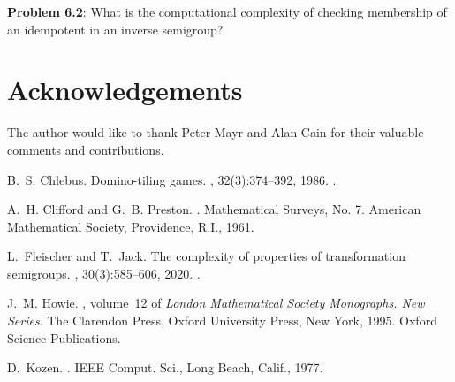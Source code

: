 \documentclass{amsart}
\theoremstyle{remark}
\numberwithin{equation}{section}
\begin{document}
\medskip
{\bf Problem 6.2}: What is the computational complexity of checking membership of an idempotent in an inverse semigroup?

\section{Acknowledgements}
The author would like to thank Peter Mayr and Alan Cain for their valuable comments and contributions.

\begin{thebibliography}{1}

B.~S. Chlebus.
\newblock Domino-tiling games.
, 32(3):374--392, 1986.
\newblock \href {http://dx.doi.org/10.1016/0022-0000(86)90036-X}
  {}.

A.~H. Clifford and G.~B. Preston.
.
\newblock Mathematical Surveys, No. 7. American Mathematical Society,
  Providence, R.I., 1961.

L.~Fleischer and T.~Jack.
\newblock The complexity of properties of transformation semigroups.
, 30(3):585--606, 2020.
\newblock \href {http://dx.doi.org/10.1142/S0218196720500125}
  {}.

J.~M. Howie.
, volume~12 of {\em London
  Mathematical Society Monographs. New Series}.
\newblock The Clarendon Press, Oxford University Press, New York, 1995.
\newblock Oxford Science Publications.

D.~Kozen.
.
\newblock IEEE Comput. Sci., Long Beach, Calif., 1977.

\end{thebibliography}
\end{document}
